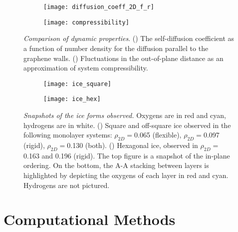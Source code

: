 \documentclass[journal=acsnano,manuscript=article]{achemso}
\begin{document}
\begin{figure}[ht!]
	\centering
	\begin{subfigure}[b]{0.28\textwidth}
    		\texttt{[image: diffusion\_coeff\_2D\_f\_r]}
		\caption{}
    		\label{fig:diff}
   	\end{subfigure}	
	\begin{subfigure}[b]{0.28\textwidth}
    		\texttt{[image: compressibility]}
		\caption{}
    		\label{fig:comp}
   	\end{subfigure}
	\caption{\textit{Comparison of dynamic properties}. (\protect{}) The self-diffusion coefficient as a function of number density for the diffusion parallel to the graphene walls. (\protect{}) Fluctuations in the out-of-plane distance as an approximation of system compressibility.}
	\label{fig:msd}
\end{figure}


\begin{figure}[ht!]
	\centering
	\begin{subfigure}[b]{0.395\textwidth}
    		\texttt{[image: ice\_square]}
		\caption{}
        		\label{fig:ice_sq}
  	\end{subfigure}
	\begin{subfigure}[b]{0.285\textwidth}
    		\texttt{[image: ice\_hex]}
		\caption{}
        		\label{fig:ice_hx}
  	\end{subfigure}
	\caption{\textit{Snapshots of the ice forms observed.} Oxygens are in red and cyan, hydrogens are in white. (\protect{}) Square and off-square ice observed in the following monolayer systems: \(\rho_{2D}=\)0.065 (flexible), \(\rho_{2D}=\)0.097 (rigid), \(\rho_{2D}=\)0.130 (both). (\protect{}) Hexagonal ice, observed in \(\rho_{2D}=\)0.163 and 0.196 (rigid). The top figure is a snapshot of the in-plane ordering. On the bottom, the A-A stacking between layers is highlighted by depicting the oxygens of each layer in red and cyan. Hydrogens are not pictured.}
	\label{fig:ice_figs}
\end{figure}

\clearpage

\section*{Computational Methods}
	
\end{document}
